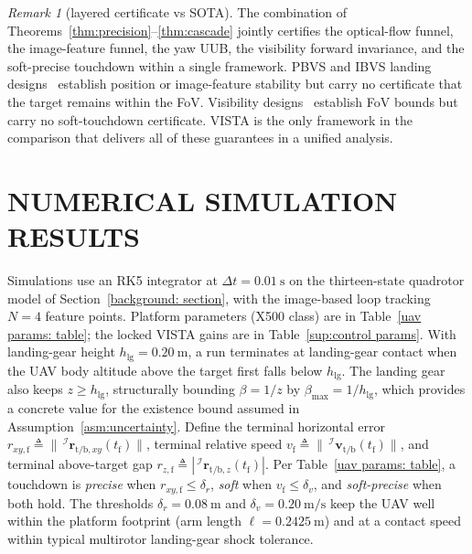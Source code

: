 \documentclass{IEEEtaes}
\theoremstyle{definition}
\theoremstyle{remark}
\newtheorem{remark}{Remark}
\begin{document}
\begin{remark}[layered certificate vs SOTA]\label{rem:layered} The combination of Theorems~\ref{thm:precision}--\ref{thm:cascade} jointly certifies the optical-flow funnel, the image-feature funnel, the yaw UUB, the visibility forward invariance, and the soft-precise touchdown within a single framework. PBVS and IBVS landing designs~\cite{lin2022, zhang2026, cho2022, lin2023} establish position or image-feature stability but carry no certificate that the target remains within the FoV. Visibility designs~\cite{salehi2021, xie2016} establish FoV bounds but carry no soft-touchdown certificate. VISTA is the only framework in the comparison that delivers all of these guarantees in a unified analysis.\end{remark}


\section{NUMERICAL SIMULATION RESULTS}
\label{experimentation: section}
Simulations use an RK5 integrator at $\Delta t=0.01~\text{s}$ on the thirteen-state quadrotor model of Section~\ref{background: section}, with the image-based loop tracking $N=4$ feature points. Platform parameters (X500 class) are in Table~\ref{uav params: table}; the locked VISTA gains are in Table~\ref{sup:control params}. With landing-gear height $h_\text{lg}=0.20~\text{m}$, a run terminates at landing-gear contact when the UAV body altitude above the target first falls below $h_\text{lg}$. The landing gear also keeps $z\ge h_\text{lg}$, structurally bounding $\beta=1/z$ by $\beta_\text{max}=1/h_\text{lg}$, which provides a concrete value for the existence bound assumed in Assumption~\ref{asm:uncertainty}. Define the terminal horizontal error $r_{xy,\text{f}} \triangleq \|\,^\mathcal{I}\boldsymbol{r}_{\text{t/b},xy}(t_\text{f})\|$, terminal relative speed $v_\text{f} \triangleq \|\,^\mathcal{I}\boldsymbol{v}_{\text{t/b}}(t_\text{f})\|$, and terminal above-target gap $r_{z,\text{f}} \triangleq |\,^\mathcal{I}\boldsymbol{r}_{\text{t/b},z}(t_\text{f})|$. Per Table~\ref{uav params: table}, a touchdown is \emph{precise} when $r_{xy,\text{f}}\le\delta_r$, \emph{soft} when $v_\text{f}\le\delta_v$, and \emph{soft-precise} when both hold. The thresholds $\delta_r=0.08~\text{m}$ and $\delta_v=0.20~\text{m/s}$ keep the UAV well within the platform footprint (arm length $\ell=0.2425~\text{m}$) and at a contact speed within typical multirotor landing-gear shock tolerance.
\end{document}
